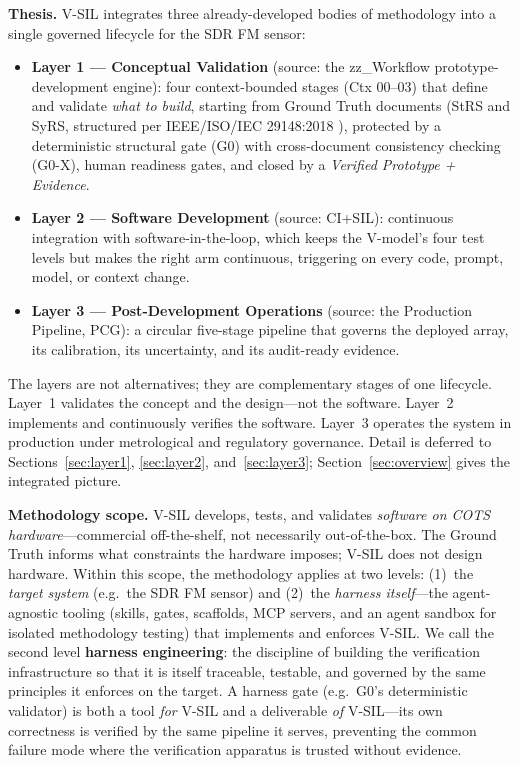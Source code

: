 \documentclass[11pt,a4paper]{article}
\begin{document}
\textbf{Thesis.} V-SIL integrates three already-developed bodies of methodology into a single
governed lifecycle for the SDR FM sensor:

\begin{itemize}
  \item \textbf{Layer 1 --- Conceptual Validation} (source: the zz\_Workflow
    prototype-development engine): four context-bounded stages (Ctx 00--03) that define and
    validate \emph{what to build}, starting from Ground Truth documents (StRS and SyRS,
    structured per IEEE/ISO/IEC 29148:2018 \cite{ieee29148}), protected by a deterministic
    structural gate (G0) with cross-document consistency checking (G0-X), human readiness
    gates, and closed by a \emph{Verified Prototype + Evidence}.
  \item \textbf{Layer 2 --- Software Development} (source: CI+SIL): continuous integration with
    software-in-the-loop, which keeps the V-model's four test levels but makes the right arm
    continuous, triggering on every code, prompt, model, or context change.
  \item \textbf{Layer 3 --- Post-Development Operations} (source: the Production Pipeline, PCG):
    a circular five-stage pipeline that governs the deployed array, its calibration, its
    uncertainty, and its audit-ready evidence.
\end{itemize}

The layers are not alternatives; they are complementary stages of one lifecycle. Layer~1
validates the concept and the design---not the software. Layer~2 implements and continuously
verifies the software. Layer~3 operates the system in production under metrological and
regulatory governance. Detail is deferred to Sections~\ref{sec:layer1}, \ref{sec:layer2}, and~\ref{sec:layer3};
Section~\ref{sec:overview} gives the integrated picture.

\textbf{Methodology scope.} V-SIL develops, tests, and validates \emph{software on COTS
hardware}---commercial off-the-shelf, not necessarily out-of-the-box. The Ground Truth informs
what constraints the hardware imposes; V-SIL does not design hardware. Within this scope, the
methodology applies at two levels: (1)~the \emph{target system} (e.g.\ the SDR FM sensor) and
(2)~the \emph{harness itself}---the agent-agnostic tooling (skills, gates, scaffolds, MCP
servers, and an agent sandbox for isolated methodology testing) that implements and enforces V-SIL. We call the second level \textbf{harness
engineering}: the discipline of building the verification infrastructure so that it is
itself traceable, testable, and governed by the same principles it enforces on the target.
A harness gate (e.g.\ G0's deterministic validator) is both a tool \emph{for} V-SIL and
a deliverable \emph{of} V-SIL---its own correctness is verified by the same pipeline it
serves, preventing the common failure mode where the verification apparatus is trusted
without evidence.
\end{document}
